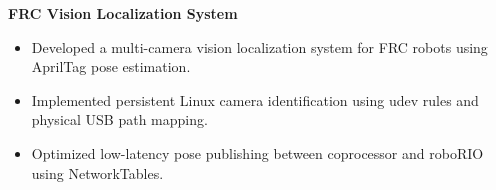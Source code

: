 \textbf{FRC Vision Localization System}
\begin{itemize}
  \item Developed a multi-camera vision localization system for FRC robots using AprilTag pose estimation.
  \item Implemented persistent Linux camera identification using udev rules and physical USB path mapping.
  \item Optimized low-latency pose publishing between coprocessor and roboRIO using NetworkTables.
\end{itemize}
